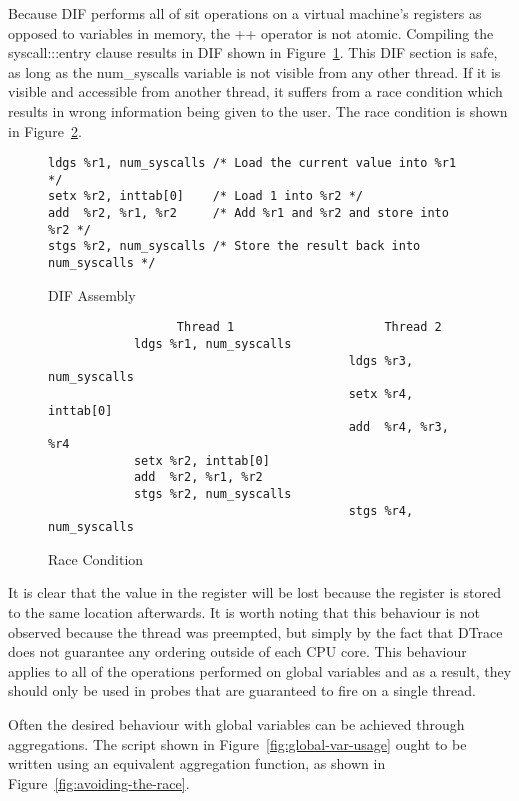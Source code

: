 \noindent
Because DIF performs all of sit operations on a virtual machine's registers as
opposed to variables in memory, the ++ operator is not atomic. Compiling the
syscall:::entry clause results in DIF shown in Figure~\ref{fig:dif-asm}.  This
DIF section is safe, as long as the num\_syscalls variable is not visible from
any other thread. If it is visible and accessible from another thread, it
suffers from a race condition which results in wrong information being given to
the user. The race condition is shown in Figure~\ref{fig:race}. \newline

\begin{figure}
\begin{lstlisting}
ldgs %r1, num_syscalls /* Load the current value into %r1 */
setx %r2, inttab[0]    /* Load 1 into %r2 */
add  %r2, %r1, %r2     /* Add %r1 and %r2 and store into %r2 */
stgs %r2, num_syscalls /* Store the result back into num_syscalls */
\end{lstlisting}
\caption{DIF Assembly}
  \label{fig:dif-asm}
\end{figure}

\begin{figure}
  \begin{lstlisting}
                  Thread 1                     Thread 2
            ldgs %r1, num_syscalls
                                          ldgs %r3, num_syscalls
                                          setx %r4, inttab[0]
                                          add  %r4, %r3, %r4
            setx %r2, inttab[0]
            add  %r2, %r1, %r2
            stgs %r2, num_syscalls
                                          stgs %r4, num_syscalls
  \end{lstlisting}
  \caption{Race Condition}
  \label{fig:race}
\end{figure}

\noindent
It is clear that the value in the  register will be lost because
the register  is stored to the same location afterwards. It is
worth noting that this behaviour is not observed because the thread was
preempted, but simply by the fact that DTrace does not guarantee any ordering
outside of each CPU core. This behaviour applies to all of the operations
performed on global variables and as a result, they should only be used in
probes that are guaranteed to fire on a single thread. \newline

\noindent
Often the desired behaviour with global variables can be achieved through
aggregations. The script shown in Figure~\ref{fig:global-var-usage} ought to be
written using an equivalent aggregation function, as shown in
Figure~\ref{fig:avoiding-the-race}.

